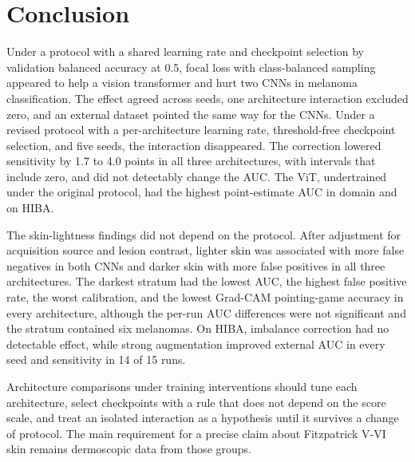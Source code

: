 \section{Conclusion}

Under a protocol with a shared learning rate and checkpoint selection by validation balanced accuracy at 0.5, focal loss with class-balanced sampling appeared to help a vision transformer and hurt two CNNs in melanoma classification. The effect agreed across seeds, one architecture interaction excluded zero, and an external dataset pointed the same way for the CNNs. Under a revised protocol with a per-architecture learning rate, threshold-free checkpoint selection, and five seeds, the interaction disappeared. The correction lowered sensitivity by 1.7 to 4.0 points in all three architectures, with intervals that include zero, and did not detectably change the AUC. The ViT, undertrained under the original protocol, had the highest point-estimate AUC in domain and on HIBA.

The skin-lightness findings did not depend on the protocol. After adjustment for acquisition source and lesion contrast, lighter skin was associated with more false negatives in both CNNs and darker skin with more false positives in all three architectures. The darkest stratum had the lowest AUC, the highest false positive rate, the worst calibration, and the lowest Grad-CAM pointing-game accuracy in every architecture, although the per-run AUC differences were not significant and the stratum contained six melanomas. On HIBA, imbalance correction had no detectable effect, while strong augmentation improved external AUC in every seed and sensitivity in 14 of 15 runs.

Architecture comparisons under training interventions should tune each architecture, select checkpoints with a rule that does not depend on the score scale, and treat an isolated interaction as a hypothesis until it survives a change of protocol. The main requirement for a precise claim about Fitzpatrick V-VI skin remains dermoscopic data from those groups.
